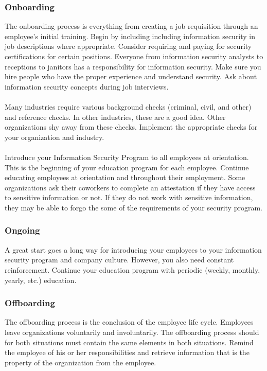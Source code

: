 \subsubsection{Onboarding}
The onboarding process is everything from creating a job requisition through an employee's initial training. Begin by including including information security in job descriptions where appropriate. Consider requiring and paying for security certifications for certain positions. Everyone from information security analysts to receptions to janitors has a responsibility for information security. Make sure you hire people who have the proper experience and understand security. Ask about information security concepts during job interviews.\\\\
Many industries require various background checks (criminal, civil, and other) and reference checks. In other industries, these are a good idea. Other organizations shy away from these checks. Implement the appropriate checks for your organization and industry.\\\\
Introduce your Information Security Program to all employees at orientation. This is the beginning of your education program for each employee. Continue educating employees at orientation and throughout their employment.
Some organizations ask their coworkers to complete an attestation if they have access to sensitive information or not. If they do not work with sensitive information, they may be able to forgo the some of the requirements of your security program.
\subsubsection{Ongoing}
A great start goes a long way for introducing your employees to your information security program and company culture. However, you also need constant reinforcement. Continue your education program with periodic (weekly, monthly, yearly, etc.) education.
\subsubsection{Offboarding}
The offboarding process is the conclusion of the employee life cycle. Employees leave organizations voluntarily and involuntarily. The offboarding process should for both situations must contain the same elements in both situations. Remind the employee of his or her responsibilities and retrieve information that is the property of the organization from the employee.
